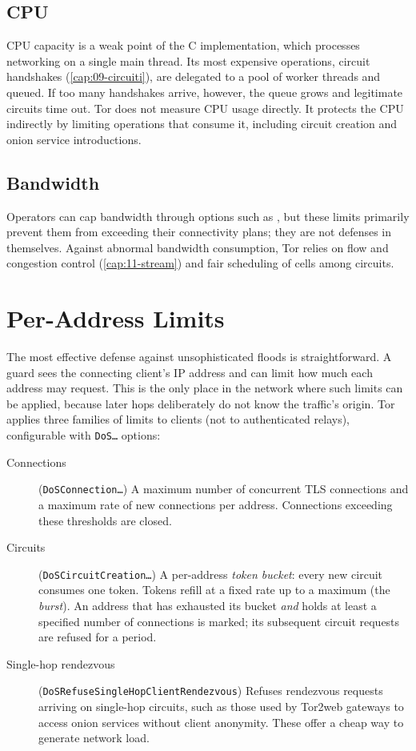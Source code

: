 \subsection{CPU}

CPU capacity is a weak point of the C implementation, which processes networking on a single main thread. Its most expensive operations, circuit handshakes (\cref{cap:09-circuiti}), are delegated to a pool of worker threads and queued. If too many handshakes arrive, however, the queue grows and legitimate circuits time out. Tor does not measure CPU usage directly. It protects the CPU indirectly by limiting operations that consume it, including circuit creation and onion service introductions.

\subsection{Bandwidth}

Operators can cap bandwidth through options such as , but these limits primarily prevent them from exceeding their connectivity plans; they are not defenses in themselves. Against abnormal bandwidth consumption, Tor relies on flow and congestion control (\cref{cap:11-stream}) and fair scheduling of cells among circuits.

\section{Per-Address Limits}\label{sec:dos-limiti}

The most effective defense against unsophisticated floods is straightforward. A guard sees the connecting client's IP address and can limit how much each address may request. This is the only place in the network where such limits can be applied, because later hops deliberately do not know the traffic's origin. Tor applies three families of limits to clients (not to authenticated relays), configurable with \texttt{DoS\ldots} options:
\begin{description}
  \item[Connections] (\texttt{DoSConnection\ldots}) A maximum number of concurrent TLS connections and a maximum rate of new connections per address. Connections exceeding these thresholds are closed.
  \item[Circuits] (\texttt{DoSCircuitCreation\ldots}) A per-address \emph{token bucket}: every new circuit consumes one token. Tokens refill at a fixed rate up to a maximum (the \emph{burst}). An address that has exhausted its bucket \emph{and} holds at least a specified number of connections is marked; its subsequent circuit requests are refused for a period.
  \item[Single-hop rendezvous] (\texttt{DoSRefuseSingleHopClientRendezvous}) Refuses rendezvous requests arriving on single-hop circuits, such as those used by Tor2web gateways to access onion services without client anonymity. These offer a cheap way to generate network load.
\end{description}

